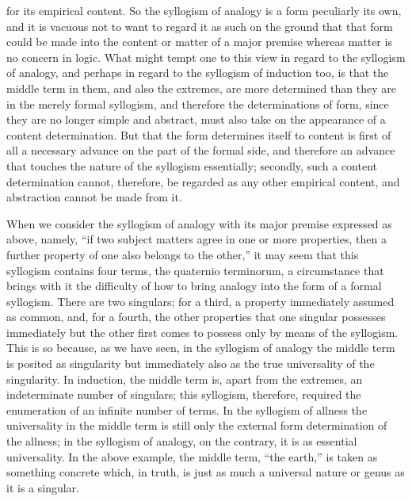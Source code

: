 for its empirical content.
So the syllogism of analogy is
a form peculiarly its own,
and it is vacuous not to want to regard it as such
on the ground that that form could be made into
the content or matter of a major premise
whereas matter is no concern in logic.
What might tempt one to this view
in regard to the syllogism of analogy,
and perhaps in regard to the syllogism of induction too,
is that the middle term in them,
and also the extremes,
are more determined than they are in the
merely formal syllogism,
and therefore the determinations of form,
since they are no longer simple and abstract,
must also take on the appearance of a content determination.
But that the form determines itself to content is
first of all a necessary advance on the part of the formal side,
and therefore an advance that touches
the nature of the syllogism essentially;
secondly, such a content determination cannot, therefore,
be regarded as any other empirical content,
and abstraction cannot be made from it.

When we consider the syllogism of analogy
with its major premise expressed as above, namely,
“if two subject matters agree in one or more properties,
then a further property of one also belongs to the other,”
it may seem that this syllogism contains four terms,
the quaternio terminorum,
a circumstance that brings with it the difficulty of
how to bring analogy into the form of a formal syllogism.
There are two singulars;
for a third, a property immediately assumed as common,
and, for a fourth, the other properties
that one singular possesses immediately
but the other first comes to possess
only by means of the syllogism.
This is so because, as we have seen,
in the syllogism of analogy
the middle term is posited as singularity
but immediately also as the true
universality of the singularity.
In induction, the middle term is,
apart from the extremes,
an indeterminate number of singulars;
this syllogism, therefore, required the enumeration
of an infinite number of terms.
In the syllogism of allness the universality
in the middle term is still only
the external form determination of the allness;
in the syllogism of analogy, on the contrary,
it is as essential universality.
In the above example, the middle term, “the earth,”
is taken as something concrete which, in truth,
is just as much a universal nature or genus
as it is a singular.

